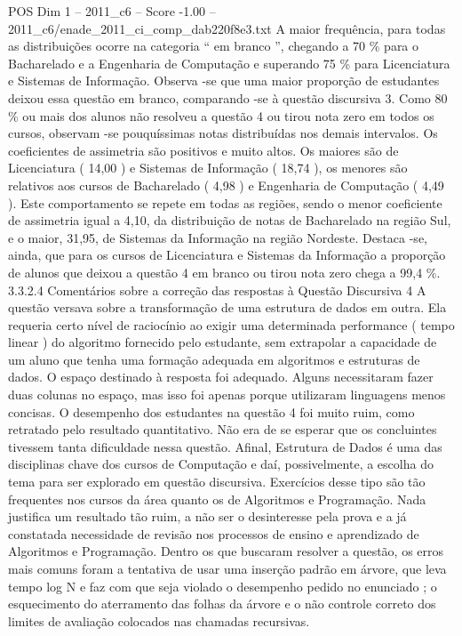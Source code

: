 \begin{textsample}{POS Dim 1 – 2011\_c6 – Score -1.00 – 2011\_c6/enade\_2011\_ci\_comp\_dab220f8e3.txt}
A maior frequência, para todas as distribuições ocorre na categoria “ em branco ”, chegando a 70 \% para o Bacharelado e a Engenharia de Computação e superando 75 \% para Licenciatura e Sistemas de Informação.
Observa -se que uma maior proporção de estudantes deixou essa questão em branco, comparando -se à questão discursiva 3.
Como 80 \% ou mais dos alunos não resolveu a questão 4 ou tirou nota zero em todos os cursos, observam -se pouquíssimas notas distribuídas nos demais intervalos.
Os coeficientes de assimetria são positivos e muito altos.
Os maiores são de Licenciatura ( 14,00 ) e Sistemas de Informação ( 18,74 ), os menores são relativos aos cursos de Bacharelado ( 4,98 ) e Engenharia de Computação ( 4,49 ).
Este comportamento se repete em todas as regiões, sendo o menor coeficiente de assimetria igual a 4,10, da distribuição de notas de Bacharelado na região Sul, e o maior, 31,95, de Sistemas da Informação na região Nordeste.
Destaca -se, ainda, que para os cursos de Licenciatura e Sistemas da Informação a proporção de alunos que deixou a questão 4 em branco ou tirou nota zero chega a 99,4 \%. 3.3.2.4 Comentários sobre a correção das respostas à Questão Discursiva 4 A questão versava sobre a transformação de uma estrutura de dados em outra.
Ela requeria certo nível de raciocínio ao exigir uma determinada performance ( tempo linear ) do algoritmo fornecido pelo estudante, sem extrapolar a capacidade de um aluno que tenha uma formação adequada em algoritmos e estruturas de dados.
O espaço destinado à resposta foi adequado.
Alguns necessitaram fazer duas colunas no espaço, mas isso foi apenas porque utilizaram linguagens menos concisas.
O desempenho dos estudantes na questão 4 foi muito ruim, como retratado pelo resultado quantitativo.
Não era de se esperar que os concluintes tivessem tanta dificuldade nessa questão.
Afinal, Estrutura de Dados é uma das disciplinas chave dos cursos de Computação e daí, possivelmente, a escolha do tema para ser explorado em questão discursiva.
Exercícios desse tipo são tão frequentes nos cursos da área quanto os de Algoritmos e Programação.
Nada justifica um resultado tão ruim, a não ser o desinteresse pela prova e a já constatada necessidade de revisão nos processos de ensino e aprendizado de Algoritmos e Programação.
Dentro os que buscaram resolver a questão, os erros mais comuns foram a tentativa de usar uma inserção padrão em árvore, que leva tempo log N e faz com que seja violado o desempenho pedido no enunciado ; o esquecimento do aterramento das folhas da árvore e o não controle correto dos limites de avaliação colocados nas chamadas recursivas.

\end{textsample}
